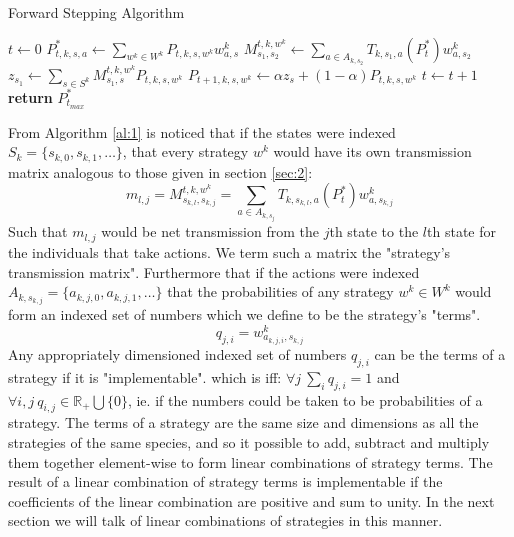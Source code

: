 \begin{algorithm}[h]
\caption{Forward Stepping Algorithm}\label{al:1}
\begin{algorithmic}[1]

\State $t\gets 0$
    \State $P^*_{t,k,s,a} \gets \sum_{w^k\in W^k}P_{t,k,s,w^k}w^k_{a,s}$
            \State $M^{t,k,w^k}_{s_1,s_2} \gets \sum_{a\in A_{k,s_2}}T_{k,s_1,a}(P^*_t) w^k_{a,s_2}$
            \State $z_{s_1} \gets \sum_{s\in S^k} M^{t,k,w^k}_{s_1,s}P_{t,k,s,w^k}$
            \State $P_{t+1,k,s,w^k} \gets \alpha z_s + (1-\alpha)P_{t,k,s,w^k}$
        \EndFor
    \EndFor
    \State $t\gets t+1$
\EndWhile
\State \textbf{return} $P^*_{t_{max}}$
\EndProcedure

\end{algorithmic}
\end{algorithm}
From Algorithm \ref{al:1} is noticed that if the states were indexed $S_k=\{s_{k,0},s_{k,1},\dots\}$, that every strategy $w^k$ would have its own transmission matrix analogous to those given in section \ref{sec:2}:\begin{equation}\label{eq:transmission_matrix}m_{l,j} = M^{t,k,w^k}_{s_{k,l},s_{k,j}} = \sum_{a\in A_{k,s_j}}T_{k,s_{k,l},a}(P^*_t) w^k_{a,s_{k,j}}\end{equation}
Such that $m_{l,j}$ would be net transmission from the $j$th state to the $l$th state for the individuals that take actions. We term such a matrix the "strategy's transmission matrix".
Furthermore that if the actions were indexed $A_{k,s_{k,j}}=\{a_{k,j,0},a_{k,j,1},\dots\}$ that the probabilities of any strategy $w^k\in W^k$ would form an indexed set of numbers which we define to be the strategy's "terms".
\begin{equation}\label{eq:probability_indices}q_{j,i}=w^k_{a_{k,j,i},s_{k,j}}\end{equation}
Any appropriately dimensioned indexed set of numbers $q_{j,i}$ can be the terms of a strategy if it is "implementable". which is iff: 
$\forall j~\sum_iq_{j,i}=1$ and $\forall i,j~q_{i,j}\in\mathbb{R}_+\bigcup\{0\}$, ie. if the numbers could be taken to be probabilities of a strategy.
The terms of a strategy are the same size and dimensions as all the strategies of the same species, and so it possible to add, subtract and multiply them together element-wise to form linear combinations of strategy terms.
The result of a linear combination of strategy terms is implementable if the coefficients of the linear combination are positive and sum to unity.
In the next section we will talk of linear combinations of strategies in this manner.
\\

